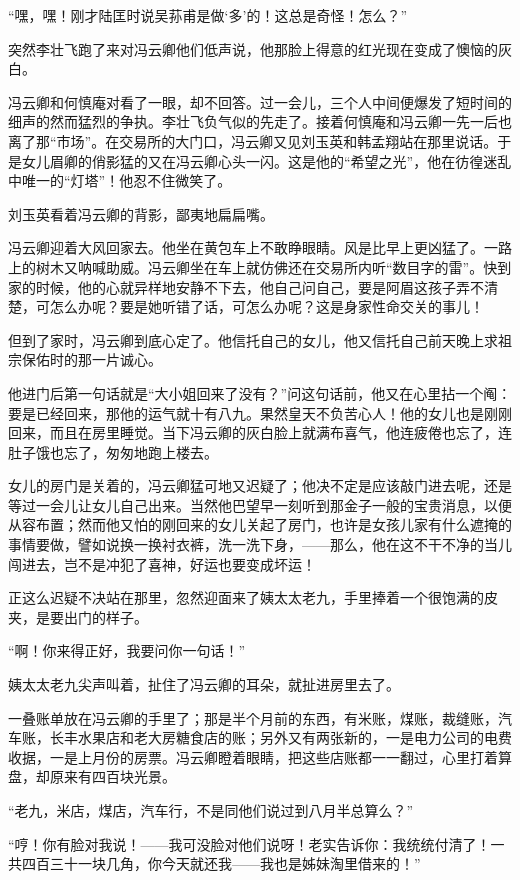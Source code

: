 \par “嘿，嘿！刚才陆匡时说吴荪甫是做‘多’的！这总是奇怪！怎么？”
\par 突然李壮飞跑了来对冯云卿他们低声说，他那脸上得意的红光现在变成了懊恼的灰白。
\par 冯云卿和何慎庵对看了一眼，却不回答。过一会儿，三个人中间便爆发了短时间的细声的然而猛烈的争执。李壮飞负气似的先走了。接着何慎庵和冯云卿一先一后也离了那“市场”。在交易所的大门口，冯云卿又见刘玉英和韩孟翔站在那里说话。于是女儿眉卿的俏影猛的又在冯云卿心头一闪。这是他的“希望之光”，他在彷徨迷乱中唯一的“灯塔”！他忍不住微笑了。
\par 刘玉英看着冯云卿的背影，鄙夷地扁扁嘴。
\par 冯云卿迎着大风回家去。他坐在黄包车上不敢睁眼睛。风是比早上更凶猛了。一路上的树木又呐喊助威。冯云卿坐在车上就仿佛还在交易所内听“数目字的雷”。快到家的时候，他的心就异样地安静不下去，他自己问自己，要是阿眉这孩子弄不清楚，可怎么办呢？要是她听错了话，可怎么办呢？这是身家性命交关的事儿！
\par 但到了家时，冯云卿到底心定了。他信托自己的女儿，他又信托自己前天晚上求祖宗保佑时的那一片诚心。
\par 他进门后第一句话就是“大小姐回来了没有？”问这句话前，他又在心里拈一个阄：要是已经回来，那他的运气就十有八九。果然皇天不负苦心人！他的女儿也是刚刚回来，而且在房里睡觉。当下冯云卿的灰白脸上就满布喜气，他连疲倦也忘了，连肚子饿也忘了，匆匆地跑上楼去。
\par 女儿的房门是关着的，冯云卿猛可地又迟疑了；他决不定是应该敲门进去呢，还是等过一会儿让女儿自己出来。当然他巴望早一刻听到那金子一般的宝贵消息，以便从容布置；然而他又怕的刚回来的女儿关起了房门，也许是女孩儿家有什么遮掩的事情要做，譬如说换一换衬衣裤，洗一洗下身，——那么，他在这不干不净的当儿闯进去，岂不是冲犯了喜神，好运也要变成坏运！
\par 正这么迟疑不决站在那里，忽然迎面来了姨太太老九，手里捧着一个很饱满的皮夹，是要出门的样子。
\par “啊！你来得正好，我要问你一句话！”
\par 姨太太老九尖声叫着，扯住了冯云卿的耳朵，就扯进房里去了。
\par 一叠账单放在冯云卿的手里了；那是半个月前的东西，有米账，煤账，裁缝账，汽车账，长丰水果店和老大房糖食店的账；另外又有两张新的，一是电力公司的电费收据，一是上月份的房票。冯云卿瞪着眼睛，把这些店账都一一翻过，心里打着算盘，却原来有四百块光景。
\par “老九，米店，煤店，汽车行，不是同他们说过到八月半总算么？”
\par “哼！你有脸对我说！——我可没脸对他们说呀！老实告诉你：我统统付清了！一共四百三十一块几角，你今天就还我——我也是姊妹淘里借来的！”
